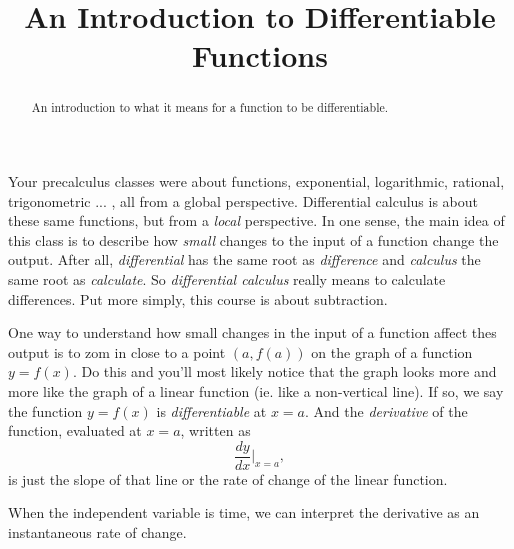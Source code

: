\documentclass{ximera}
\title{An Introduction to Differentiable Functions}
\begin{document}
\begin{abstract}
An introduction to what it means for a function to be differentiable.
\end{abstract}
\maketitle

Your precalculus classes were about functions, exponential, logarithmic, rational, trigonometric ... , all from a global perspective. Differential calculus is about these same functions, but from a \emph{local} perspective. In one sense, the main idea of this class is to describe how \emph{small} changes to the input of a function change the output. After all, \emph{differential} has the same root as \emph{difference} and \emph{calculus} the same root as \emph{calculate}. So \emph{differential calculus} really means to calculate differences. Put more simply, this course is about subtraction.

One way to understand how small changes in the input of a function affect thes output is to zom in close to a point $(a,f(a))$ on the graph of a function $y=f(x)$. Do this and you'll most likely notice that the graph looks more and more like the graph of a linear function (ie. like a non-vertical line). If so, we say the function $y=f(x)$ is \emph{differentiable} at $x=a$. And the \emph{derivative} of the function, evaluated at $x=a$, written as
\[
     \frac{dy}{dx}\Big|_{x=a},
\]
is just the slope of that line or the rate of change of the linear function.

When the independent variable is time, we can interpret the derivative as an instantaneous rate of change.
\end{document}
